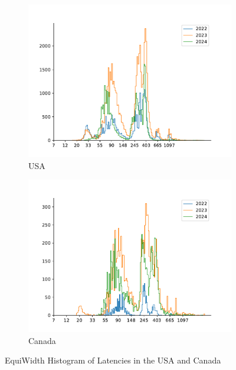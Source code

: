 \begin{figure}
	\centering
	\begin{subfigure}[b]{0.8\linewidth}
		\includegraphics[width=\linewidth]{chapters/4-results/latency/img/histogram_of_latencies_of_starlink_probes_in_united_states.pdf}
		\caption{USA}
	\end{subfigure}
	\begin{subfigure}[b]{0.8\linewidth}
		\includegraphics[width=\linewidth]{chapters/4-results/latency/img/histogram_of_latencies_of_starlink_probes_in_canada.pdf}
		\caption{Canada}
	\end{subfigure}
	\caption{EquiWidth Histogram of Latencies in the USA and Canada}
	\label{fig:latency-histogram-1}
\end{figure}


